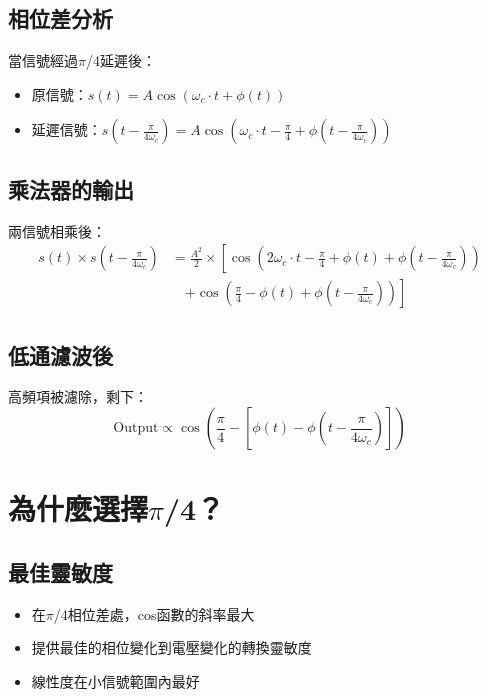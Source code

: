 \documentclass{article}
\begin{document}
\subsection{相位差分析}
當信號經過$\pi$/4延遲後：
\begin{itemize}
    \item 原信號：$s(t) = A \cos(\omega_c \cdot t + \phi(t))$
    \item 延遲信號：$s\left(t - \frac{\pi}{4\omega_c}\right) = A \cos\left(\omega_c \cdot t - \frac{\pi}{4} + \phi\left(t - \frac{\pi}{4\omega_c}\right)\right)$
\end{itemize}

\subsection{乘法器的輸出}
兩信號相乘後：
\begin{align}
s(t) \times s\left(t - \frac{\pi}{4\omega_c}\right) &= \frac{A^2}{2} \times \left[\cos\left(2\omega_c \cdot t - \frac{\pi}{4} + \phi(t) + \phi\left(t - \frac{\pi}{4\omega_c}\right)\right)\right. \nonumber \\
&\quad \left.+ \cos\left(\frac{\pi}{4} - \phi(t) + \phi\left(t - \frac{\pi}{4\omega_c}\right)\right)\right]
\end{align}

\subsection{低通濾波後}
高頻項被濾除，剩下：
\begin{equation}
\text{Output} \propto \cos\left(\frac{\pi}{4} - \left[\phi(t) - \phi\left(t - \frac{\pi}{4\omega_c}\right)\right]\right)
\end{equation}

\section{為什麼選擇$\pi$/4？}

\subsection{最佳靈敏度}
\begin{itemize}
    \item 在$\pi$/4相位差處，cos函數的斜率最大
    \item 提供最佳的相位變化到電壓變化的轉換靈敏度
    \item 線性度在小信號範圍內最好
\end{itemize}
\end{document}
